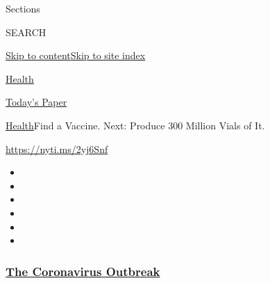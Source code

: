Sections

SEARCH

\protect\hyperlink{site-content}{Skip to
content}\protect\hyperlink{site-index}{Skip to site index}

\href{https://www.nytimes3xbfgragh.onion/section/health}{Health}

\href{https://myaccount.nytimes3xbfgragh.onion/auth/login?response_type=cookie\&client_id=vi}{}

\href{https://www.nytimes3xbfgragh.onion/section/todayspaper}{Today's
Paper}

\href{/section/health}{Health}\textbar{}Find a Vaccine. Next: Produce
300 Million Vials of It.

\url{https://nyti.ms/2yj6Snf}

\begin{itemize}
\item
\item
\item
\item
\item
\item
\end{itemize}

\hypertarget{the-coronavirus-outbreak}{%
\subsubsection{\texorpdfstring{\href{https://www.nytimes3xbfgragh.onion/news-event/coronavirus?name=styln-coronavirus-national\&region=TOP_BANNER\&block=storyline_menu_recirc\&action=click\&pgtype=Article\&impression_id=7aa06790-f28b-11ea-b918-ff3c9aed24f9\&variant=undefined}{The
Coronavirus
Outbreak}}{The Coronavirus Outbreak}}\label{the-coronavirus-outbreak}}

